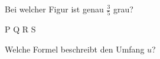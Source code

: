 \documentclass[11pt]{article}
\begin{document}
\begin{aufgabe}{Bei welcher Figur ist genau $\frac{3}{5}$ grau? \\    }

P  \quad Q  \quad R  \quad S 
\end{aufgabe}

\begin{aufgabe}{\begin{minipage}[t]{0.6\linewidth}Welche Formel beschreibt den Umfang $u$? \\    \end{minipage}\hfill\begin{minipage}[t]{0.37\linewidth}\vspace{0pt}
\end{minipage}}
\end{aufgabe}
\end{document}
